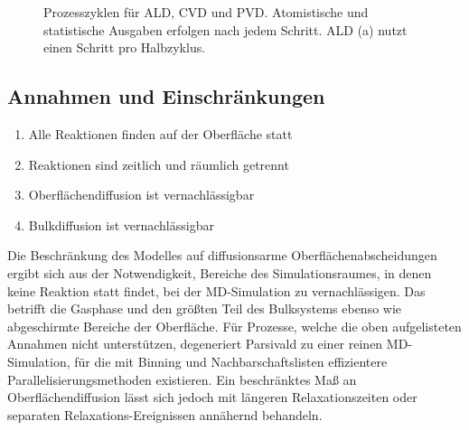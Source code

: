 \begin{figure}
  \captionsetup[subfigure]{singlelinecheck=false}
  \begin{subfigure}[t]{5.7cm}
    \def\svgwidth{\textwidth}
    
  \end{subfigure}
  \hfill
  \begin{subfigure}[t]{4.7cm}
    \def\svgwidth{\textwidth}
    
  \end{subfigure}
  \hfill
  \begin{subfigure}[t]{3cm}
    \def\svgwidth{\textwidth}
    
  \end{subfigure}
  \caption[Prozesszyklen für ALD, CVD und PVD]{
    Prozesszyklen für ALD, CVD und PVD.
    Atomistische und statistische Ausgaben erfolgen nach jedem Schritt.
    ALD (a) nutzt einen Schritt pro Halbzyklus.
  }
  \label{fig:parsivald-modes}
\end{figure}

\subsection{Annahmen und Einschränkungen}

\begin{enumerate}
\item Alle Reaktionen finden auf der Oberfläche statt
\item Reaktionen sind zeitlich und räumlich getrennt
\item Oberflächendiffusion ist vernachlässigbar
\item Bulkdiffusion ist vernachlässigbar
\end{enumerate}

Die Beschränkung des Modelles auf diffusionsarme Oberflächenabscheidungen ergibt sich aus der Notwendigkeit, Bereiche des Simulationsraumes, in denen keine Reaktion statt findet, bei der MD-Simulation zu vernachlässigen.
Das betrifft die Gasphase und den größten Teil des Bulksystems ebenso wie abgeschirmte Bereiche der Oberfläche.
Für Prozesse, welche die oben aufgelisteten Annahmen nicht unterstützen, degeneriert Parsivald zu einer reinen MD-Simulation, für die mit Binning und Nachbarschaftslisten effizientere Parallelisierungsmethoden existieren.
Ein beschränktes Maß an Oberflächendiffusion lässt sich jedoch mit  längeren Relaxationszeiten oder separaten Relaxations-Ereignissen annähernd behandeln.

